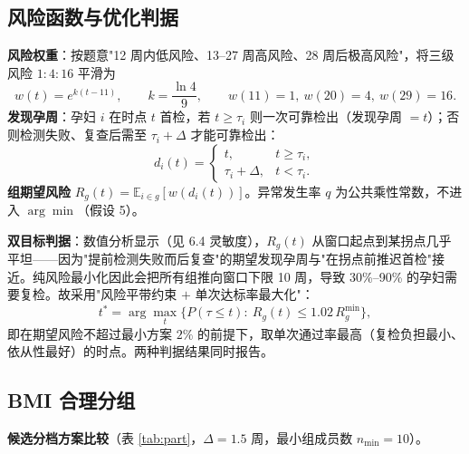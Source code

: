 \documentclass[11pt,a4paper]{ctexart}
\newcommand{\E}{\mathbb{E}}
\begin{document}
\subsection{风险函数与优化判据}
\textbf{风险权重}：按题意"12 周内低风险、13--27 周高风险、28 周后极高风险"，将三级风险 $1:4:16$ 平滑为
\begin{equation}
w(t)=e^{k(t-11)},\qquad k=\frac{\ln4}{9},\qquad
w(11)=1,\ w(20)=4,\ w(29)=16.
\label{eq:w}
\end{equation}
\textbf{发现孕周}：孕妇 $i$ 在时点 $t$ 首检，若 $t\ge\tau_i$ 则一次可靠检出（发现孕周 $=t$）；否则检测失败、复查后需至 $\tau_i+\Delta$ 才能可靠检出：
\begin{equation}
d_i(t)=\begin{cases}t, & t\ge\tau_i,\\ \tau_i+\Delta, & t<\tau_i.\end{cases}
\label{eq:d}
\end{equation}
\textbf{组期望风险} $R_g(t)=\E_{i\in g}[w(d_i(t))]$。异常发生率 $q$ 为公共乘性常数，不进入 $\arg\min$（假设 5）。

\textbf{双目标判据}：数值分析显示（见 6.4 灵敏度），$R_g(t)$ 从窗口起点到某拐点几乎平坦——因为"提前检测失败而后复查"的期望发现孕周与"在拐点前推迟首检"接近。纯风险最小化因此会把所有组推向窗口下限 10 周，导致 30\%--90\% 的孕妇需要复检。故采用"风险平带约束 $+$ 单次达标率最大化"：
\begin{equation}
t^{*}=\arg\max_{t}\bigl\{P(\tau\le t):\ R_g(t)\le 1.02\,R_g^{\min}\bigr\},
\label{eq:obj}
\end{equation}
即在期望风险不超过最小方案 $2\%$ 的前提下，取单次通过率最高（复检负担最小、依从性最好）的时点。两种判据结果同时报告。

\subsection{BMI 合理分组}
\textbf{候选分档方案比较}（表 \ref{tab:part}，$\Delta=1.5$ 周，最小组成员数 $n_{\min}=10$）。
\end{document}
